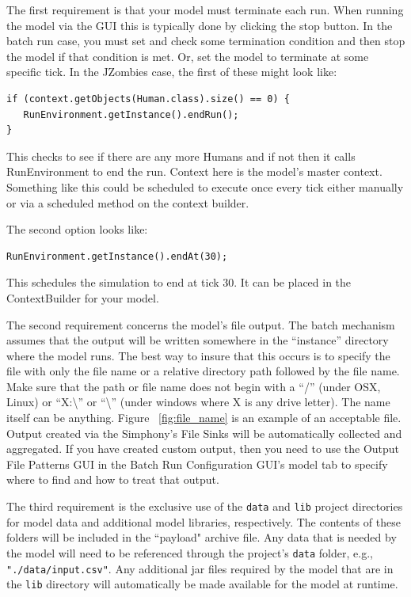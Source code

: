 \documentclass[11pt]{amsart}
\begin{document}
The first requirement is that your model must terminate each run. When running the model via the GUI this is typically done by clicking the stop button. In the batch run case, you must set and check some termination condition and then stop the model if that condition is met. Or, set the model to terminate at some specific tick. In the JZombies case, the first of these might look like:

\begin{verbatim}
if (context.getObjects(Human.class).size() == 0) {
   RunEnvironment.getInstance().endRun();
}
\end{verbatim}
\noindent
This checks to see if there are any more Humans and if not then it calls RunEnvironment to end the run. Context here is the model's master context. Something like this could be scheduled to execute once every tick either manually or via a scheduled method on the context builder.

The second option looks like:

\begin{verbatim}
RunEnvironment.getInstance().endAt(30);
\end{verbatim}
\noindent
This schedules the simulation to end at tick 30. It can be placed in the ContextBuilder for your model.

The second requirement concerns the model's file output. The batch mechanism assumes that the output will be written somewhere in the ``instance'' directory where the model runs. The best way to insure that this occurs is to specify the file with only the file name or a relative directory path followed by the file name. Make sure that the path or file name does not begin with a ``/'' (under OSX, Linux) or ``X:\textbackslash'' or ``\textbackslash'' (under windows where X is any drive letter). The name itself can be anything. Figure ~\ref{fig:file_name} is an example of an acceptable file. Output created via the Simphony's File Sinks will be automatically collected and aggregated. If you have created custom output, then you need to use the Output File Patterns GUI in the Batch Run Configuration GUI's model tab to specify where to find and how to treat that output.

The third requirement is the exclusive use of the {\tt data} and {\tt lib} project directories for model data and additional model libraries, respectively. The contents of these folders will be included in the ``payload" archive file. Any data that is needed by the model will need to be referenced through the project's {\tt data} folder, e.g., {\tt "./data/input.csv"}. Any additional jar files required by the model that are in the {\tt lib} directory will automatically be made available for the model at runtime.
\end{document}
